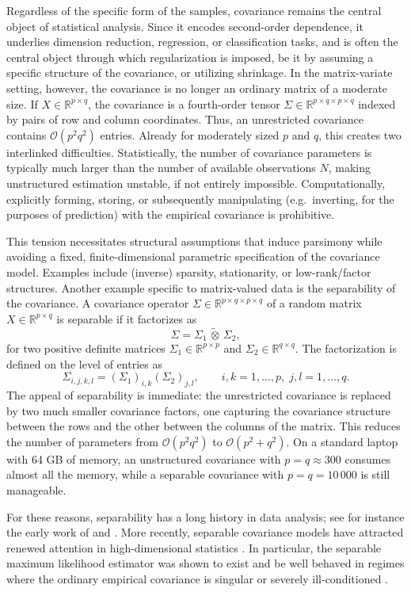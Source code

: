 \documentclass[12pt]{article}
\newcommand{\R}{\mathbb{R}}
\newcommand{\ot}{\,\tilde\otimes\,}
\begin{document}
Regardless of the specific form of the samples, covariance remains the central object of statistical analysis. Since it encodes second-order dependence, it underlies dimension reduction, regression, or classification tasks, and is often the central object through which regularization is imposed, be it by assuming a specific structure of the covariance, or utilizing shrinkage. In the matrix-variate setting, however, the covariance is no longer an ordinary matrix of a moderate size. If $X \in \R^{p \times q}$, the covariance is a fourth-order tensor $\Sigma \in \R^{p \times q \times p \times q}$ indexed by pairs of row and column coordinates. Thus, an unrestricted covariance contains $\mathcal{O}(p^2q^2)$ entries. Already for moderately sized $p$ and $q$, this creates two interlinked difficulties. Statistically, the number of covariance parameters is typically much larger than the number of available observations $N$, making unstructured estimation unstable, if not entirely impossible. Computationally, explicitly forming, storing, or subsequently manipulating (e.g.~inverting, for the purposes of prediction) with the empirical covariance is prohibitive.

This tension necessitates structural assumptions that induce parsimony while avoiding a fixed, finite-dimensional parametric specification of the covariance model. Examples include (inverse) sparsity, stationarity, or low-rank/factor structures. Another example specific to matrix-valued data is the separability of the covariance. A covariance operator $\Sigma \in \R^{p \times q \times p \times q}$ of a random matrix $X \in \R^{p \times q}$ is separable if it factorizes as
\[
\Sigma = \Sigma_1 \ot \Sigma_2,
\]
for two positive definite matrices $\Sigma_1 \in \R^{p \times p}$ and $\Sigma_2 \in \R^{q \times q}$. The factorization is defined on the level of entries as
\[
\Sigma_{i,j,k,l} = (\Sigma_1)_{i,k}(\Sigma_2)_{j,l}, \qquad i,k=1,\ldots,p,\; j,l=1,\ldots,q.
\]
The appeal of separability is immediate: the unrestricted covariance is replaced by two much smaller covariance factors, one capturing the covariance structure between the rows and the other between the columns of the matrix. This reduces the number of parameters from $\mathcal{O}(p^2q^2)$ to $\mathcal{O}(p^2+q^2)$. On a standard laptop with 64 GB of memory, an unstructured covariance with $p=q\approx300$ consumes almost all the memory, while a separable covariance with $p=q=10\,000$ is still manageable.

For these reasons, separability has a long history in data analysis; see for instance the early work of \citet{dawid1981matrix} and \citet{mardia1993spatiotemporal}. More recently, separable covariance models have attracted renewed attention in high-dimensional statistics \citep{greenewald2019tensor,hoff2023core, zhang2023matrix,yu2023testing,mccormack2025information}. In particular, the separable maximum likelihood estimator was shown to exist and be well behaved in regimes where the ordinary empirical covariance is singular or severely ill-conditioned \citep{dutilleul1999mle,soloveychik2016gaussian,drton2021,franks2026near}.
\end{document}
